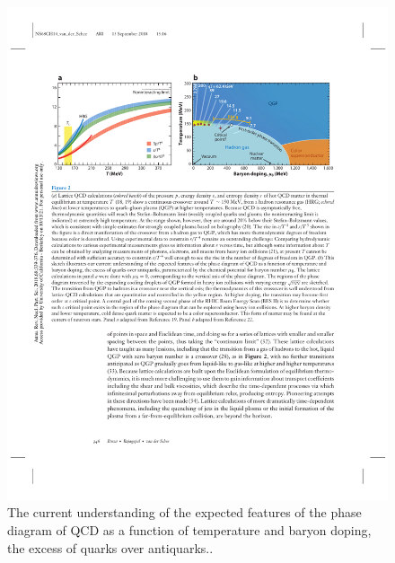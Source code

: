 \begin{figure}[htpb]
  \centering
  \includegraphics[width=.99\textwidth]{Introduction/qcd_phase.pdf}
  \caption{The current understanding of the expected features of the phase diagram of QCD as a function of temperature and baryon doping, the excess of quarks over antiquarks.\cite{annurev-nucl}.}
\label{fig:qcd_phase}
\end{figure}

